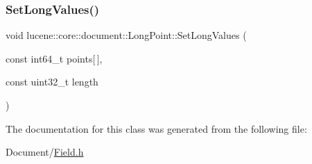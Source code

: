 \subsubsection{\texorpdfstring{Set\+Long\+Values()}{SetLongValues()}}
{\footnotesize\ttfamily void lucene\+::core\+::document\+::\+Long\+Point\+::\+Set\+Long\+Values (\begin{DoxyParamCaption}\item[{const int64\+\_\+t}]{points\mbox{[}$\,$\mbox{]},  }\item[{const uint32\+\_\+t}]{length }\end{DoxyParamCaption})\hspace{0.3cm}{\ttfamily [inline]}}



The documentation for this class was generated from the following file\+:\begin{DoxyCompactItemize}
\item 
Document/\mbox{\hyperlink{Document_2Field_8h}{Field.\+h}}\end{DoxyCompactItemize}
